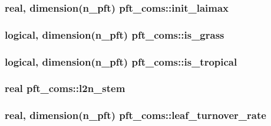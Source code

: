 \subsubsection[{\texorpdfstring{init\+\_\+laimax}{init_laimax}}]{\setlength{\rightskip}{0pt plus 5cm}real, dimension(n\+\_\+pft) pft\+\_\+coms\+::init\+\_\+laimax}\hypertarget{namespacepft__coms_aee1c14f39841cdf40c9655ae6eab2e85}{}\label{namespacepft__coms_aee1c14f39841cdf40c9655ae6eab2e85}
\subsubsection[{\texorpdfstring{is\+\_\+grass}{is_grass}}]{\setlength{\rightskip}{0pt plus 5cm}logical, dimension(n\+\_\+pft) pft\+\_\+coms\+::is\+\_\+grass}\hypertarget{namespacepft__coms_a74313e4ba2eb3134ae662a573ee862e4}{}\label{namespacepft__coms_a74313e4ba2eb3134ae662a573ee862e4}
\subsubsection[{\texorpdfstring{is\+\_\+tropical}{is_tropical}}]{\setlength{\rightskip}{0pt plus 5cm}logical, dimension(n\+\_\+pft) pft\+\_\+coms\+::is\+\_\+tropical}\hypertarget{namespacepft__coms_ae26d357a418f5441d136c81e335cd633}{}\label{namespacepft__coms_ae26d357a418f5441d136c81e335cd633}
\subsubsection[{\texorpdfstring{l2n\+\_\+stem}{l2n_stem}}]{\setlength{\rightskip}{0pt plus 5cm}real pft\+\_\+coms\+::l2n\+\_\+stem}\hypertarget{namespacepft__coms_aadbb3423514f8f93b48b2a626d4b000d}{}\label{namespacepft__coms_aadbb3423514f8f93b48b2a626d4b000d}
\subsubsection[{\texorpdfstring{leaf\+\_\+turnover\+\_\+rate}{leaf_turnover_rate}}]{\setlength{\rightskip}{0pt plus 5cm}real, dimension(n\+\_\+pft) pft\+\_\+coms\+::leaf\+\_\+turnover\+\_\+rate}\hypertarget{namespacepft__coms_a3c2cfe5a5095b3617d6ef0eda3088d07}{}\label{namespacepft__coms_a3c2cfe5a5095b3617d6ef0eda3088d07}
